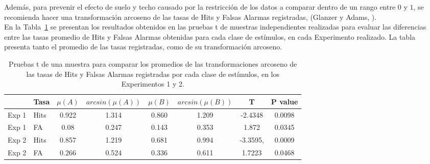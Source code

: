 
Además, para prevenir el efecto de suelo y techo causado por la restricción de los datos a comparar dentro de un rango entre $0$ y $1$, se recomienda hacer una transformación arcoseno de las tasas de Hits y Falsas Alarmas registradas, (Glanzer y Adams, \citeyear{Glanzer1990}).\\ 

En la Tabla~\ref{Tabla_t-HitsyFA} se presentan los resultados obtenidos en las pruebas t de muestras independientes realizadas para evaluar las diferencias entre las tasas promedio de Hits y Falsas Alarmas obtenidas para cada clase de estímulos, en cada Experimento realizado. La tabla presenta tanto el promedio de las tasas registradas, como de su transformación arcoseno.\\

\begin{table}[h]
\caption[Prueba t para evaluar las diferencias entre las tasas de Hits y Falsas Alarmas registradas en promedio por cada clase de estímulos]{Pruebas t de una muestra para comparar los promedios de las transformaciones arcoseno de las tasas de Hits y Falsas Alarmas registradas por cada clase de estímulos, en los Experimentos 1 y 2.}
\label{Tabla_t-HitsyFA}
\centering
\begin{tabular}{l l | c c c c c c}
\toprule
\textbf{} & \textbf{Tasa} & \textbf{$\mu(A)$} & \textbf{$arcsin(\mu(A))$} & \textbf{$\mu(B)$} & \textbf{$arcsin(\mu(B))$} &\textbf{T} & \textbf{P value}\\
\midrule
Exp 1 & Hits & 0.922 & 1.314 & 0.860 & 1.209 & -2.4348 & 0.0098 \\
Exp 1 & FA & 0.08 & 0.247 & 0.143 & 0.353 & 1.872 & 0.0345 \\
Exp 2 & Hits & 0.857 & 1.219 & 0.681 & 0.994 & -3.3595, & 0.0009 \\
Exp 2 & FA & 0.266 & 0.524 & 0.336 & 0.611 & 1.7223 & 0.0468 \\
\bottomrule
\end{tabular}
\end{table}

